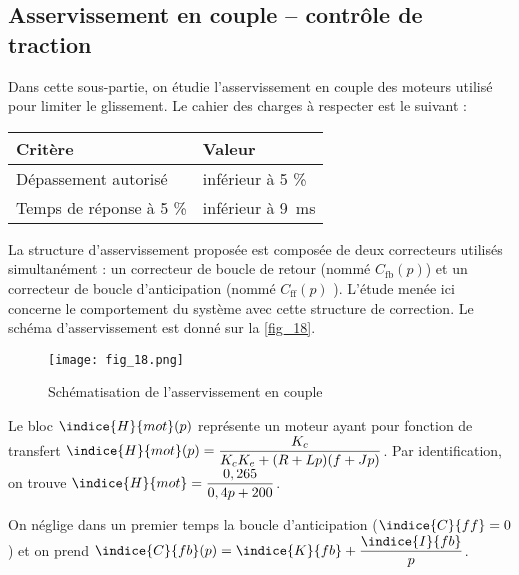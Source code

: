 \subsection{Asservissement en couple – contrôle de traction}

\begin{obj}
Dans cette sous-partie, on étudie l’asservissement en couple des moteurs utilisé pour
limiter le glissement. Le cahier des charges à respecter est le suivant :

\begin{center}
\begin{tabular}{ll}
\hline
\textbf{Critère} & \textbf{Valeur} \\ \hline \hline
Dépassement autorisé & inférieur à 5 \% \\ \hline
Temps de réponse à 5 \% & inférieur à \SI{9}{ms} \\ \hline
\end{tabular}
\end{center}

\end{obj}


La structure d’asservissement proposée est composée de deux correcteurs utilisés simultanément :
un correcteur de boucle de retour (nommé $C_{\text{fb}}( p)$) et un correcteur de boucle d'anticipation
(nommé $C_{\text{ff}}( p)$ ). L’étude menée ici concerne le comportement du système avec cette structure
de correction.
Le schéma d'asservissement est donné sur la \autoref{fig_18}.

\begin{figure}[H]
\centering
\texttt{[image: fig\_18.png]}
\caption{Schématisation de l'asservissement en couple \label{fig_18}}
\end{figure}


Le bloc  $\indice{H}{mot} (p)$ représente un moteur ayant pour fonction de transfert
$\indice{H}{mot} (p)=\dfrac{K_c}{K_c K_e+(R+Lp)( f +Jp)}$. Par identification, on trouve $\indice{H}{mot}= \dfrac{0,265}{0,4 p+200}$.


\ifprof
\begin{corrige}
\end{corrige}
\else
\fi

On néglige dans un premier temps la boucle d'anticipation ($\indice{C}{ff} =0$) et on prend
$\indice{C}{fb}( p)=\indice{K}{fb}+\dfrac{\indice{I}{fb}}{p}$.

